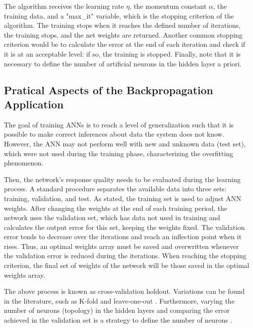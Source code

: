 
The algorithm receives the learning rate $\eta$, the momentum constant $\alpha$, the training data, and a "max\_it" variable, which is the stopping criterion of the algorithm. The training stops when it reaches the defined number of iterations, the training stops, and the net weights are returned. Another common stopping criterion would be to calculate the error at the end of each iteration and check if it is at an acceptable level: if so, the training is stopped. Finally, note that it is necessary to define the number of artificial neurons in the hidden layer a priori.

\subsection{Pratical Aspects of the Backpropagation Application}
\label{ssec:Pratical}

The goal of training ANNs is to reach a level of generalization such that it is possible to make correct inferences about data the system does not know. However, the ANN may not perform well with new and unknown data (test set), which were not used during the training phase, characterizing the overfitting phenomenon.

Then, the network's response quality needs to be evaluated during the learning process. A standard procedure separates the available data into three sets: training, validation, and test. As stated, the training set is used to adjust ANN weights. After changing the weights at the end of each training period, the network uses the validation set, which has data not used in training and calculates the output error for this set, keeping the weights fixed. The validation error tends to decrease over the iterations and reach an inflection point when it rises. Thus, an optimal weights array must be saved and overwritten whenever the validation error is reduced during the iterations. When reaching the stopping criterion, the final set of weights of the network will be those saved in the optimal weights array.

The above process is known as cross-validation holdout. Variations can be found in the literature, such as K-fold and leave-one-out \cite{haykin, Castro2006FundamentalsON}.
Furthermore, varying the number of neurons (topology) in the hidden layers and comparing the error achieved in the validation set is a strategy to define the number of neurons \cite{James2013}.

